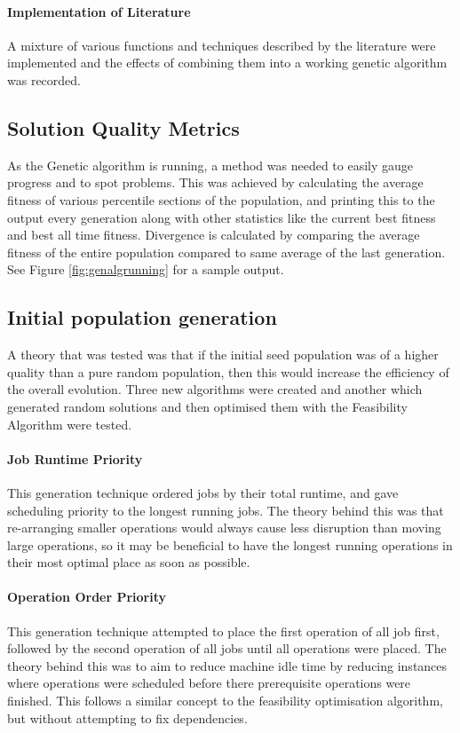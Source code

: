 \documentclass[14pt]{acmsiggraph}
\begin{document}
\paragraph{Implementation of Literature}
A mixture of various functions and techniques described by the literature were implemented and the effects of combining them into a working genetic algorithm was recorded.

\subsection{Solution Quality Metrics}
As the Genetic algorithm is running, a method was needed to easily gauge progress and to spot problems. This was achieved by calculating the average fitness of various percentile sections of the population, and printing this to the output every generation along with other statistics like the current best fitness and  best all time fitness.  Divergence is calculated by comparing the average fitness of the entire population compared to same average of the last generation.
See Figure \ref{fig:genalgrunning} for a sample output.

\subsection{Initial population generation}
A theory that was tested was that if the initial seed population was of a higher quality than a pure random population, then this would increase the efficiency of the overall evolution. Three new algorithms were created and another which generated random solutions and then optimised them with the Feasibility Algorithm were tested.

\paragraph{Job Runtime Priority}
This generation technique ordered jobs by their total runtime, and gave  scheduling priority to the longest running jobs. The theory behind this was that re-arranging smaller operations would always cause less disruption than moving large operations, so it may be beneficial to have the longest running operations in their most optimal place as soon as possible.

\paragraph{Operation Order Priority}
This generation technique attempted to place the first operation of all job first, followed by the second operation of all jobs until all operations were placed. The theory behind this was to aim to reduce machine idle time by reducing instances where operations were scheduled before there prerequisite operations were finished. This follows a similar concept to the feasibility optimisation algorithm, but without attempting to fix dependencies.
\end{document}
